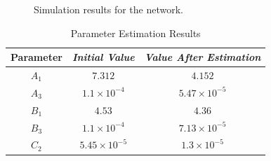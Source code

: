 \documentclass[conference]{IEEEtran}
\begin{document}
\begin{figure}[!h]
	\centering
	\hfil
	\hfil
	\caption{Simulation results for the network.} \label{fig_sim}
\end{figure}


\begin{table}[!h]
	\renewcommand{\arraystretch}{1.3}
	\caption{Parameter Estimation Results}
	\begin{center}
	\begin{tabular}{c c c}
	\hline
	\textbf{Parameter} & \textbf{\textit{Initial Value}}& \textbf{\textit{Value After Estimation}} \\
	\hline
	$A_1$ & $7.312$ & $4.152$ \\
	$A_3$  & $1.1\times10^{-4}$ & $5.47\times10^{-5}$\\
	$B_1$  & $4.53$ & $4.36$ \\
	$B_3$  & $1.1\times10^{-4}$ & $7.13\times10^{-5}$ \\ 
	$C_2$  & $5.45\times10^{-5}$ & $1.3\times10^{-5}$ \\
	\hline
	\end{tabular}
	\label{tab1}
	\end{center}
\end{table}
\end{document}
